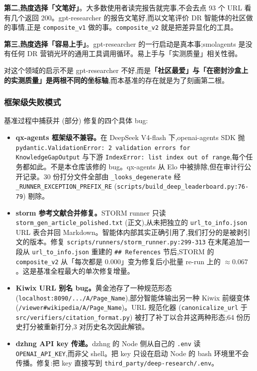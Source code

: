\documentclass[UTF8,a4paper,12pt,oneside]{ctexart}
\begin{document}
\textbf{第二,热度选择「文笔好」}。大多数使用者读完报告就完事,不会去点 93 个 URL 看有几个返回 200。gpt-researcher 的报告文笔好,而以文笔评价 DR 智能体的社区做的事情,正是 \texttt{composite\_v1} 做的事。\texttt{composite\_v2} 就是把差异显化的工具。

\textbf{第三,热度选择「容易上手」}。gpt-researcher 的一行启动是真本事;smolagents 是没有任何 DR 营销光环的通用工具调用循环。易上手与「实测质量」相关性弱。

对这个领域的启示不是 gpt-researcher 不好,而是\textbf{「社区最爱」与「在密封沙盒上的实测质量」是两根不同的坐标轴},而本基准的存在就是为了刻画第二根。

\subsubsection{框架级失败模式}

基准过程中捕获并 (部分) 修复的四个具体 bug:

\begin{itemize}[leftmargin=2em]
\item \textbf{qx-agents 框架级不兼容。}在 DeepSeek V4-flash 下,openai-agents SDK 抛 \texttt{pydantic.ValidationError: 2 validation errors for KnowledgeGapOutput} 与下游 \texttt{IndexError: list index out of range},每个任务都如此。不是本仓库该修的 bug。qx-agents 从 Elo 中被排除,但在审计行公开记录。30 份打分文件全部由 \texttt{\_looks\_degenerate} 经 \texttt{\_RUNNER\_EXCEPTION\_PREFIX\_RE} (\texttt{scripts/build\_deep\_leaderboard.py:76-79}) 剔除。

\item \textbf{storm 参考文献合并修复。}STORM runner 只读 \texttt{storm\_gen\_article\_polished.txt} (正文),从未把独立的 \texttt{url\_to\_info.json} URL 表合并回 Markdown。智能体内部其实正确引用了,我们打分的是被剥引文的版本。修复 \texttt{scripts/runners/storm\_runner.py:299-313} 在末尾追加一段从 \texttt{url\_to\_info.json} 重建的 \texttt{\#\# References} 节后,STORM 的 \texttt{composite\_v2} 从「每次都是 0.000」变为修复后小批量 re-run 上的 \(\approx 0.067\)。这是基准全程最大的单次修复增量。

\item \textbf{Kiwix URL 别名 bug。}黄金池存了一种规范形态 (\texttt{localhost:8090/.../A/Page\_Name}),部分智能体输出另一种 Kiwix 前缀变体 (\texttt{/viewer\#wikipedia/A/Page\_Name})。URL 规范化器 (\texttt{canonicalize\_url} 于 \texttt{src/verifiers/citation\_format.py}) 被打了补丁以合并这两种形态;64 份历史打分被重新打分,3 对历史名次因此解锁。

\item \textbf{dzhng API key 传递。}dzhng 的 Node 侧从自己的 \texttt{.env} 读 \texttt{OPENAI\_API\_KEY},而非父 shell。把 key 只设在启动 Node 的 bash 环境里不会传播。修复:把 key 直接写到 \texttt{third\_party/deep-research/.env}。
\end{itemize}
\end{document}
